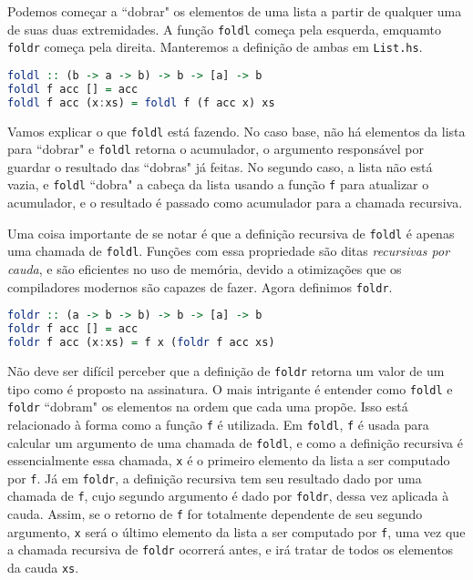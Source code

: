 \documentclass[a4paper]{article}
\begin{document}
Podemos começar a ``dobrar" os elementos de uma lista a partir de qualquer uma de suas duas extremidades.
A função \texttt{foldl} começa pela esquerda, emquamto \texttt{foldr} começa pela direita.
Manteremos a definição de ambas em \texttt{List.hs}.

\begin{lstlisting}[language=haskell, frame=single]
foldl :: (b -> a -> b) -> b -> [a] -> b
foldl f acc [] = acc
foldl f acc (x:xs) = foldl f (f acc x) xs
\end{lstlisting}

Vamos explicar o que \texttt{foldl} está fazendo.
No caso base, não há elementos da lista para ``dobrar" e \texttt{foldl} retorna o acumulador, o argumento responsável por guardar o resultado das ``dobras" já feitas.
No segundo caso, a lista não está vazia, e \texttt{foldl} ``dobra" a cabeça da lista usando a função \texttt{f} para atualizar o acumulador, e o resultado é passado como acumulador para a chamada recursiva.

Uma coisa importante de se notar é que a definição recursiva de \texttt{foldl} é apenas uma chamada de \texttt{foldl}.
Funções com essa propriedade são ditas \emph{recursivas por cauda}, e são eficientes no uso de memória, devido a otimizações que os compiladores modernos são capazes de fazer. Agora definimos \texttt{foldr}.

\begin{lstlisting}[language=haskell, frame=single]
foldr :: (a -> b -> b) -> b -> [a] -> b
foldr f acc [] = acc
foldr f acc (x:xs) = f x (foldr f acc xs)
\end{lstlisting}

Não deve ser difícil perceber que a definição de \texttt{foldr} retorna um valor de um tipo como é proposto na assinatura.
O mais intrigante é entender como \texttt{foldl} e \texttt{foldr} ``dobram" os elementos na ordem que cada uma propõe.
Isso está relacionado à forma como a função \texttt{f} é utilizada.
Em \texttt{foldl}, \texttt{f} é usada para calcular um argumento de uma chamada de \texttt{foldl}, e como a definição recursiva é essencialmente essa chamada, \texttt{x} é o primeiro elemento da lista a ser computado por \texttt{f}.
Já em \texttt{foldr}, a definição recursiva tem seu resultado dado por uma chamada de \texttt{f}, cujo segundo argumento é dado por \texttt{foldr}, dessa vez aplicada à cauda. Assim, se o retorno de \texttt{f} for totalmente dependente de seu segundo argumento, \texttt{x} será o último elemento da lista a ser computado por \texttt{f}, uma vez que a chamada recursiva de \texttt{foldr} ocorrerá antes, e irá tratar de todos os elementos da cauda \texttt{xs}.
\end{document}

